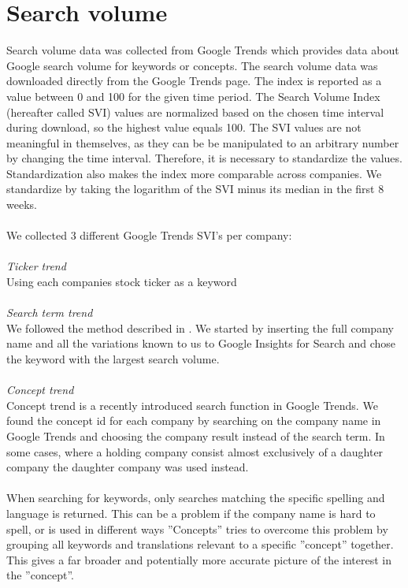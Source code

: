 \section{Search volume}
Search volume data was collected from Google Trends which provides data about Google search volume for keywords or concepts. The search volume data was downloaded directly from the Google Trends page. The index is reported as a value between 0 and 100 for the given time period. The Search Volume Index (hereafter called SVI) values are normalized based on the chosen time interval during download, so the highest value equals 100. The SVI values are not meaningful in themselves, as they can be be manipulated to an arbitrary number by changing the time interval. Therefore, it is necessary to standardize the values. Standardization also makes the index more comparable across companies. We standardize by taking the logarithm of the SVI minus its median in the first 8 weeks. 
\\\\
We collected 3 different Google Trends SVI's per company:
\\\\
\textit{Ticker trend}
\\
Using each companies stock ticker as a keyword
\\\\
\textit{Search term trend}
\\
We followed the method described in  \cite{vlastakis}. We started by inserting the full company name and all the variations known to us to Google Insights for Search and chose the keyword with the largest search volume.
\\\\
\textit{Concept trend}
\\
Concept trend is a recently introduced search function in Google Trends. We found the concept id for each company by searching on the company name in Google Trends and choosing the company result instead of the search term. In some cases, where a holding company consist almost exclusively of a daughter company the daughter company was used instead.
\\\\
When searching for keywords, only searches matching the specific spelling and language is returned. This can be a problem if the company name is hard to spell, or is used in different ways ”Concepts” tries to overcome this problem by grouping all keywords and translations relevant to a specific ”concept” together. This gives a far broader and potentially more accurate picture of the interest in the ”concept”.
